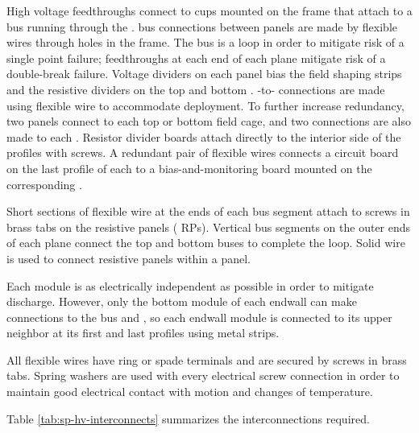 High voltage feedthroughs connect to cups mounted on the  frame
that attach to a  bus running through the .   bus connections
between  panels are made by flexible wires through holes in the
 frame. The  bus is a loop in order to mitigate risk of a single
point failure; feedthroughs at each end of each  plane mitigate
risk of a double-break failure.  Voltage dividers on each  panel
bias the field shaping strips and the resistive dividers on the top
and bottom .  -to- connections are made using
flexible wire to accommodate  deployment.  To further
increase redundancy, two  panels connect to each top or bottom
field cage, and two connections are also made to each . Resistor divider boards attach directly to the interior side of
the  profiles with screws.   A redundant pair of flexible wires
connects a circuit board on the last profile of each  to a
bias-and-monitoring board mounted on the corresponding .

Short sections of flexible wire at the ends of each  bus segment
attach to screws in brass tabs on the  resistive panels ( RPs).
Vertical  bus segments on the outer ends of each  plane connect
the top and bottom  buses to complete the loop.  Solid wire is used
to connect resistive panels within a  panel.

Each  module is as electrically independent as possible in order to
mitigate discharge.  However, only the bottom module of each endwall
can make connections to the  bus and , so each endwall module
is connected to its upper neighbor at its first and last profiles
using metal strips.

All flexible wires have ring or spade terminals and are secured by
screws in brass tabs.  Spring washers are used with every electrical
screw connection in order to maintain good electrical contact with
motion and changes of temperature.

Table \ref{tab:sp-hv-interconnects} summarizes the interconnections
required.

